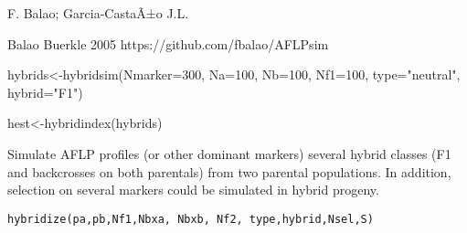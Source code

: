 \documentclass[letterpaper]{book}
\begin{document}
%
\begin{Author}\relax
F. Balao;
Garcia-CastaÃ±o J.L.
\end{Author}
%
\begin{References}\relax
Balao
Buerkle 2005
https://github.com/fbalao/AFLPsim
\end{References}
%
\begin{SeeAlso}\relax
{}
\end{SeeAlso}
%
\begin{Examples}
\begin{ExampleCode}
hybrids<-hybridsim(Nmarker=300, Na=100, Nb=100, Nf1=100, type="neutral", hybrid="F1")

hest<-hybridindex(hybrids)
\end{ExampleCode}
\end{Examples}
%
\begin{Description}\relax
Simulate AFLP profiles (or other dominant markers) several hybrid classes (F1 and backcrosses on both parentals) from two parental populations. In addition, selection on several markers could be simulated in hybrid progeny.
\end{Description}
%
\begin{Usage}
\begin{verbatim}
hybridize(pa,pb,Nf1,Nbxa, Nbxb, Nf2, type,hybrid,Nsel,S)
\end{verbatim}
\end{Usage}
%
\end{document}
